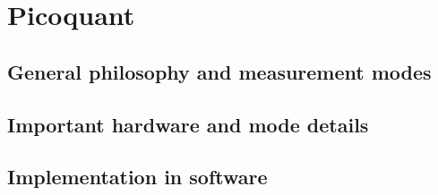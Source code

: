 \chapter{Picoquant}

\section{General philosophy and measurement modes}

\section{Important hardware and mode details}

\section{Implementation in software}